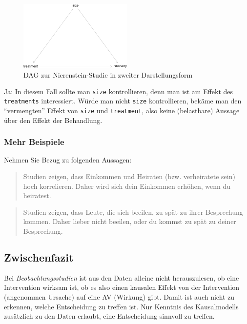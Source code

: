 \documentclass[
  a4paper,
  DIV=11]{scrreprt}
\theoremstyle{definition}
\theoremstyle{remark}
\begin{document}
\begin{figure}

{\centering \includegraphics[width=0.5\textwidth,height=\textheight]{./kausal_files/figure-pdf/fig-dag-studie-c2-1.pdf}

}

\caption{\label{fig-dag-studie-c2}DAG zur Nierenstein-Studie in zweiter
Darstellungsform}

\end{figure}

Ja: In diesem Fall sollte man \texttt{size} kontrollieren, denn man ist
am Effekt des \texttt{treatments} interessiert. Würde man nicht
\texttt{size} kontrollieren, bekäme man den ``vermengten'' Effekt von
\texttt{size} und \texttt{treatment}, also keine (belastbare) Aussage
über den Effekt der Behandlung.

\hypertarget{mehr-beispiele}{%
\subsubsection{Mehr Beispiele}\label{mehr-beispiele}}

Nehmen Sie Bezug zu folgenden Aussagen:

\begin{quote}
Studien zeigen, dass Einkommen und Heiraten (bzw. verheiratete sein)
hoch korrelieren. Daher wird sich dein Einkommen erhöhen, wenn du
heiratest.
\end{quote}

\begin{quote}
Studien zeigen, dass Leute, die sich beeilen, zu spät zu ihrer
Besprechung kommen. Daher lieber nicht beeilen, oder du kommst zu spät
zu deiner Besprechung.
\end{quote}

\hypertarget{zwischenfazit}{%
\subsection{Zwischenfazit}\label{zwischenfazit}}

Bei \emph{Beobachtungsstudien} ist aus den Daten alleine nicht
herauszulesen, ob eine Intervention wirksam ist, ob es also einen
kausalen Effekt von der Intervention (angenommen Ursache) auf eine AV
(Wirkung) gibt. Damit ist auch nicht zu erkennen, welche Entscheidung zu
treffen ist. Nur Kenntnis des Kausalmodells zusätzlich zu den Daten
erlaubt, eine Entscheidung sinnvoll zu treffen.
\end{document}
